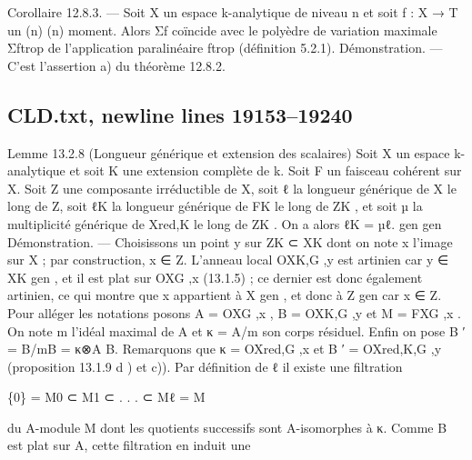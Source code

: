 \documentclass[
  10pt,
]{article}
\newenvironment{Shaded}{}{}
\newcommand{\NormalTok}[1]{#1}
\begin{document}
\begin{Shaded}
\begin{Highlighting}[]
\NormalTok{Corollaire 12.8.3. — Soit X un espace k{-}analytique de niveau n et soit f : X → T un}
\NormalTok{                  (n)                                             (n)}
\NormalTok{moment. Alors Σf coïncide avec le polyèdre de variation maximale Σftrop de l’application}
\NormalTok{paralinéaire ftrop (définition 5.2.1).}
\NormalTok{Démonstration. — C’est l’assertion a) du théorème 12.8.2.}
\end{Highlighting}
\end{Shaded}

\subsection{CLD.txt, newline lines
19153--19240}\label{cld.txt-newline-lines-1915319240}

\begin{Shaded}
\begin{Highlighting}[]
\NormalTok{Lemme 13.2.8 (Longueur générique et extension des scalaires)}
\NormalTok{    Soit X un espace k{-}analytique et soit K une extension complète de k. Soit F un}
\NormalTok{faisceau cohérent sur X. Soit Z une composante irréductible de X, soit ℓ la longueur}
\NormalTok{générique de X le long de Z, soit ℓK la longueur générique de FK le long de ZK , et soit}
\NormalTok{µ la multiplicité générique de Xred,K le long de ZK . On a alors ℓK = µℓ.}
\NormalTok{                                                   gen     gen}
\NormalTok{Démonstration. — Choisissons un point y sur ZK         ⊂ XK    dont on note x l’image sur}
\NormalTok{X ; par construction, x ∈ Z. L’anneau local OXK,G ,y est artinien car y ∈ XK    gen}
\NormalTok{                                                                                    , et il est}
\NormalTok{plat sur OXG ,x (13.1.5) ; ce dernier est donc également artinien, ce qui montre que x}
\NormalTok{appartient à X gen , et donc à Z gen car x ∈ Z.}
\NormalTok{   Pour alléger les notations posons A = OXG ,x , B = OXK,G ,y et M = FXG ,x . On note m}
\NormalTok{l’idéal maximal de A et κ = A/m son corps résiduel. Enfin on pose B ′ = B/mB = κ⊗A B.}
\NormalTok{Remarquons que κ = OXred,G ,x et B ′ = OXred,K,G ,y (proposition 13.1.9 d ) et c)).}
\NormalTok{   Par définition de ℓ il existe une filtration}

\NormalTok{                             \{0\} = M0 ⊂ M1 ⊂ . . . ⊂ Mℓ = M}

\NormalTok{du A{-}module M dont les quotients successifs sont A{-}isomorphes à κ. Comme B est plat}
\NormalTok{sur A, cette filtration en induit une}


\end{Highlighting}
\end{Shaded}
\end{document}
